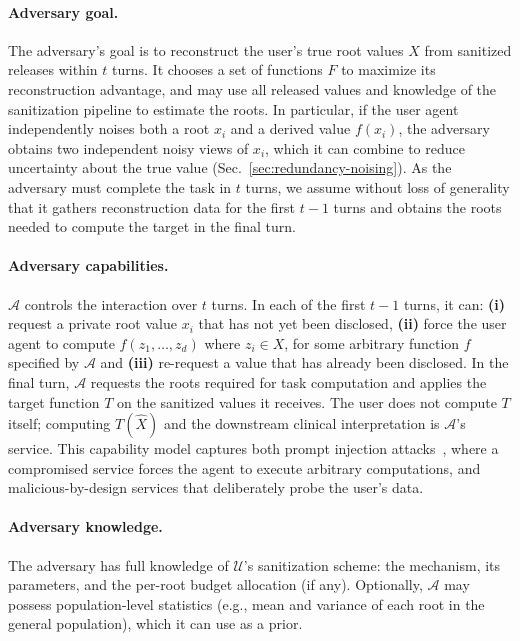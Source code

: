 \paragraph{Adversary goal.} The adversary's goal is to reconstruct the user's true root values $X$ from sanitized releases within $t$ turns. It chooses a set of functions $F$ to maximize its reconstruction advantage, and may use all released values and knowledge of the sanitization pipeline to estimate the roots. In particular, if the user agent independently noises both a root $x_i$ and a derived value $f(x_i)$, the adversary obtains two independent noisy views of $x_i$, which it can combine to reduce uncertainty about the true value (Sec.~\ref{sec:redundancy-noising}). As the adversary must complete the task in $t$ turns, we assume without loss of generality that it gathers reconstruction data for the first $t - 1$ turns and obtains the roots needed to compute the target in the final turn.

\paragraph{Adversary capabilities.} $\mathcal{A}$ controls the interaction over $t$ turns. In each of the first $t - 1$ turns, it can: \textbf{(i)} request a private root value $x_i$ that has not yet been disclosed, \textbf{(ii)} force the user agent to compute $f(z_1, \dots, z_d)$ where $ z_i\in X$, for some arbitrary function $f$ specified by $\mathcal{A}$ and \textbf{(iii)} re-request a value that has already been disclosed. In the final turn, $\mathcal{A}$ requests the roots required for task computation and applies the target function $T$ on the sanitized values it receives. The user does not compute $T$ itself; computing $T(\hat{X})$ and the downstream clinical interpretation is $\mathcal{A}$'s service. This capability model captures both prompt injection attacks~\cite{greshake2023indirect,zhan2024injecagent}, where a compromised service forces the agent to execute arbitrary computations, and malicious-by-design services that deliberately probe the user's data.

\paragraph{Adversary knowledge.} The adversary has full knowledge of $\mathcal{U}$'s sanitization scheme: the mechanism, its parameters, and the per-root budget allocation (if any). Optionally, $\mathcal{A}$ may possess population-level statistics (e.g., mean and variance of each root in the general population), which it can use as a prior.

